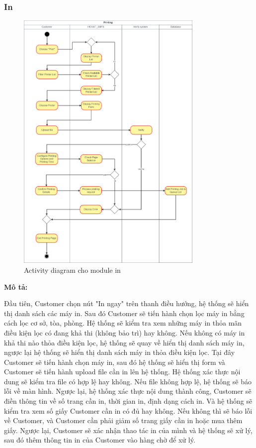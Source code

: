 \subsubsection{In}
\begin{figure}[H]
    \begin{center}
        \includegraphics[width=0.8\textwidth]{Images/System Modelling/Printing_Activity.png}
        \caption{Activity diagram cho module in}
    \end{center}
\end{figure}
\textbf{Mô tả: }\par
Đầu tiên, Customer chọn nút "In ngay" trên thanh điều hướng, hệ thống sẽ hiển thị danh sách các máy in. Sau đó Customer sẽ tiến hành chọn lọc máy in bằng cách lọc cơ sở, tòa, phòng. Hệ thống sẽ kiểm tra xem những máy in thỏa mãn điều kiện lọc có đang khả thi (không bảo trì) hay không. Nếu không có máy in khả thi nào thỏa điều kiện lọc, hệ thống sẽ quay về hiển thị danh sách máy in, ngược lại hệ thống sẽ hiển thị danh sách máy in thỏa điều kiện lọc. Tại đây Customer sẽ tiến hành chọn máy in, sau đó hệ thống sẽ hiển thị form và Customer sẽ tiến hành upload file cần in lên hệ thống. Hệ thống xác thực nội dung sẽ kiểm tra file có hợp lệ hay không. Nếu file không hợp lệ, hệ thống sẽ báo lỗi về màn hình. Ngược lại, hệ thống xác thực nội dung thành công, Customer sẽ điền thông tin về số trang cần in, thời gian in, định dạng cách in. Và hệ thống sẽ kiểm tra xem số giấy Customer cần in có đủ hay không. Nếu không thì sẽ báo lỗi về Customer, và Customer cần phải giảm số trang giấy cần in hoặc mua thêm giấy. Ngược lại, Customer sẽ xác nhận thao tác in của mình và hệ thống sẽ xử lý, sau đó thêm thông tin in của Customer vào hàng chờ để xử lý.

